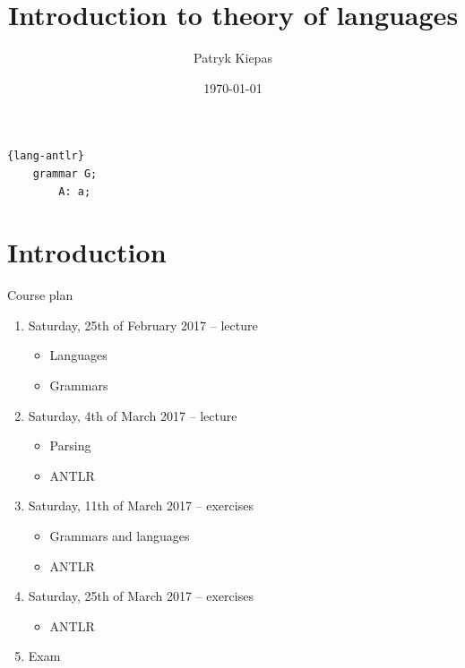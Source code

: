 \documentclass{beamer}
\title[Theory of languages]{Introduction to theory of languages}
\author{Patryk Kiepas}
\institute{MINES ParisTech \\ AGH University Of Science and Technology \\ THALES}
\date{\today}
\begin{document}
\begin{frame}[fragile]
	\begin{lstlisting}{lang-antlr}
	grammar G;
		A: a;
	\end{lstlisting}
\end{frame}

\begin{frame}
  \titlepage
\end{frame}


\section{Introduction}

\begin{frame}{Course plan}

\begin{enumerate}
\item Saturday, 25th of February 2017 -- lecture
\begin{itemize}
\item Languages
\item Grammars
\end{itemize}
\item Saturday, 4th of March 2017 -- lecture
\begin{itemize}
\item Parsing
\item ANTLR
\end{itemize}
\item Saturday, 11th of March 2017 -- exercises
\begin{itemize}
\item Grammars and languages
\item ANTLR
\end{itemize}
\item Saturday, 25th of March 2017 -- exercises
\begin{itemize}
\item ANTLR
\end{itemize}
\item Exam
\end{enumerate}

\end{frame}
\end{document}
